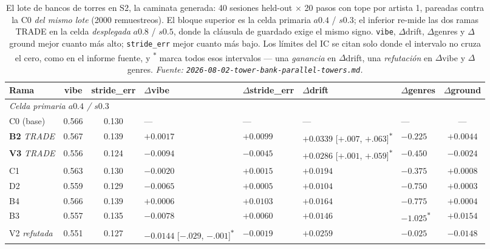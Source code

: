 \documentclass[11pt]{article}
\begin{document}
\begin{table}[ht]
  \centering
  \caption{El lote de bancos de torres en S2, la caminata generada: \num{40}
  sesiones held-out $\times$ \num{20} pasos con tope por artista 1, pareadas
  contra la C0 \emph{del mismo lote} (\num{2000} remuestreos). El bloque superior
  es la celda primaria $a\num{0.4}$ / $s\num{0.3}$; el inferior re-mide las dos
  ramas TRADE en la celda \emph{desplegada} $a\num{0.8}$ / $s\num{0.5}$, donde la
  cláusula de guardado exige el mismo signo. \texttt{vibe}, $\Delta$drift,
  $\Delta$genres y $\Delta$ground mejor cuanto más alto; \texttt{stride\_err}
  mejor cuanto más bajo. Los límites del IC se citan solo donde el intervalo no
  cruza el cero, como en el informe fuente, y \textsuperscript{$\ast$} marca todos
  esos intervalos --- una \emph{ganancia} en $\Delta$drift, una
  \emph{refutación} en $\Delta$vibe y $\Delta$genres.
  \emph{Fuente: \texttt{2026-08-02-tower-bank-parallel-towers.md}.}}
  \label{tab:nexttrack-towerbank-s2}
  {\scriptsize\setlength{\tabcolsep}{2.6pt}\begin{tabular}{lccllllc}
    \toprule
    Rama & vibe & stride\_err & $\Delta$vibe & $\Delta$stride\_err & $\Delta$drift & $\Delta$genres & $\Delta$ground \\
    \midrule
    \multicolumn{8}{l}{\emph{Celda primaria $a\num{0.4}$ / $s\num{0.3}$}} \\
    C0 (base) & 0.566 & 0.130 & --- & --- & --- & --- & --- \\
    \textbf{B2} \emph{TRADE} & 0.567 & 0.139 & $+0.0017$ & $+0.0099$ & $\mathbf{+0.0339}$ [$+.007$, $+.063$]\textsuperscript{$\ast$} & $-0.225$ & $+0.0044$ \\
    \textbf{V3} \emph{TRADE} & 0.556 & 0.124 & $-0.0094$ & $-0.0045$ & $\mathbf{+0.0286}$ [$+.001$, $+.059$]\textsuperscript{$\ast$} & $-0.450$ & $-0.0024$ \\
    C1 & 0.563 & 0.130 & $-0.0020$ & $+0.0015$ & $+0.0194$ & $-0.375$ & $+0.0008$ \\
    D2 & 0.559 & 0.129 & $-0.0065$ & $+0.0005$ & $+0.0104$ & $-0.750$ & $+0.0003$ \\
    B4 & 0.566 & 0.139 & $+0.0006$ & $+0.0103$ & $+0.0164$ & $-0.775$ & $+0.0004$ \\
    B3 & 0.557 & 0.135 & $-0.0078$ & $+0.0060$ & $+0.0146$ & $\mathbf{-1.025}$\textsuperscript{$\ast$} & $+0.0154$ \\
    V2 \emph{refutada} & 0.551 & 0.127 & $\mathbf{-0.0144}$ [$-.029$, $-.001$]\textsuperscript{$\ast$} & $-0.0019$ & $+0.0259$ & $-0.025$ & $-0.0148$ \\

\end{tabular}}
\end{table}
\end{document}

